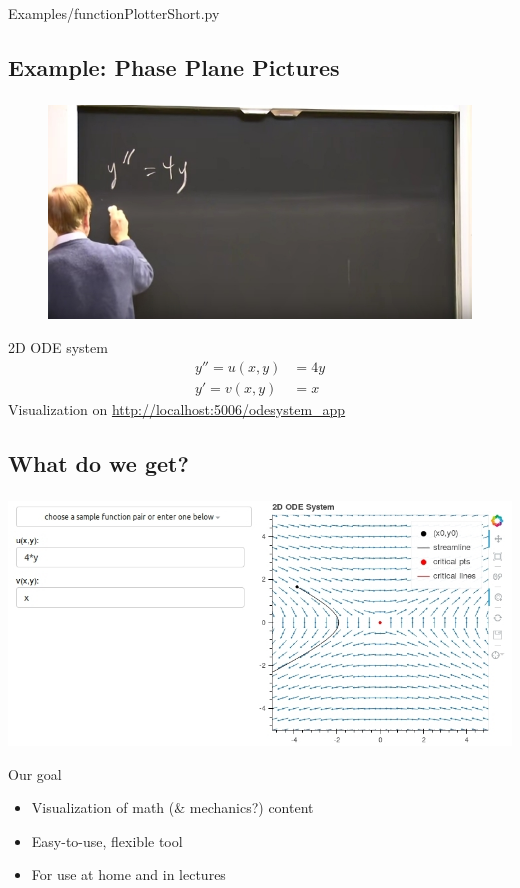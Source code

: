 \documentclass[11pt]{beamer}
\newcommand{\cmark}{\ding{51}}%
\newcommand{\citem}{\item[\textcolor{olive}{\cmark}]}
\begin{document}
\begin{frame}

{Examples/functionPlotterShort.py}
\end{frame}

\subsection{Example: Phase Plane Pictures}
\begin{frame}
\frametitle{\insertsubsection}
\begin{figure}
\includegraphics[width=.7\textwidth]{Pictures/Strang1.jpg}
\end{figure}
\pause
\begin{block}{2D ODE system}
\begin{align*}
y'' = u(x,y) & = 4y \\
y' = v(x,y) & = x
\end{align*}
Visualization on \url{http://localhost:5006/odesystem_app}
\end{block}
\end{frame}

\subsection{What do we get?}
\begin{frame}
\frametitle{\insertsubsection}
\begin{center}
\includegraphics[height=.5\textheight]{Pictures/PhasePortraitPlot.jpg}
\end{center}
\begin{block}{Our goal}
\begin{itemize}
\citem Visualization of math (\& mechanics?) content
\citem Easy-to-use, flexible tool
\citem For use at home and in lectures
\end{itemize}
\end{block}

\end{frame}
\end{document}
